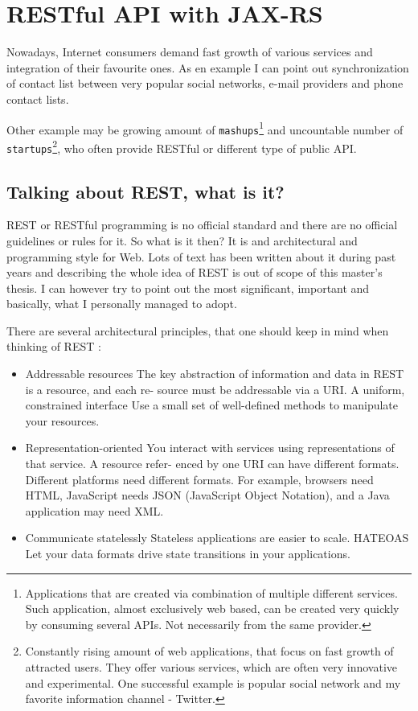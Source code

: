 \chapter{RESTful API with JAX-RS}\label{rest}

	Nowadays, Internet consumers demand fast growth of various services and integration of their favourite ones. As en
	example I can point out synchronization of contact list between very popular social networks, e-mail providers and
	phone contact lists. 
	
	Other example may be growing amount of \verb|mashups|\footnote{Applications that are created via
	combination of multiple different services. Such application, almost exclusively web based, can be created very quickly
	by consuming several \gls{API}s. Not necessarily from the same provider.} and uncountable number of
	\verb|startups|\footnote{Constantly rising amount of web applications, that focus on fast growth of attracted users.
	They offer various services, which are often very innovative and experimental. One successful example is popular
	social network and my favorite information channel - Twitter.}, who often provide RESTful or different type of public
	\gls{API}.

	\section{Talking about REST, what is it?}
	
	\gls{REST} or RESTful programming is no official standard and there are no official guidelines or rules for it. So what
	is it then? It is and architectural and programming style for Web. Lots of text has been written about it during past
	years and describing the whole idea of REST is out of scope of this master's thesis. I can however try to point out the
	most significant, important and basically, what I personally managed to adopt.
	
	There are several architectural principles, that one should keep in mind when thinking of REST \cite[p.~3]{restful}:
	
	\begin{itemize}
	  \item Addressable resources 
	  	The key abstraction of information and data in REST is a resource, and each re-
		source must be addressable via a \gls{URI}.
		A uniform, constrained interface
		Use a small set of well-defined methods to manipulate your resources.
		\item Representation-oriented 
		You interact with services using representations of that service. A resource refer-
		enced by one URI can have different formats. Different platforms need different
		formats. For example, browsers need HTML, JavaScript needs JSON (JavaScript
		Object Notation), and a Java application may need XML.
		\item Communicate statelessly
		Stateless applications are easier to scale.
		\gls{HATEOAS}
		Let your data formats drive state transitions in your applications.
	\end{itemize}
	
